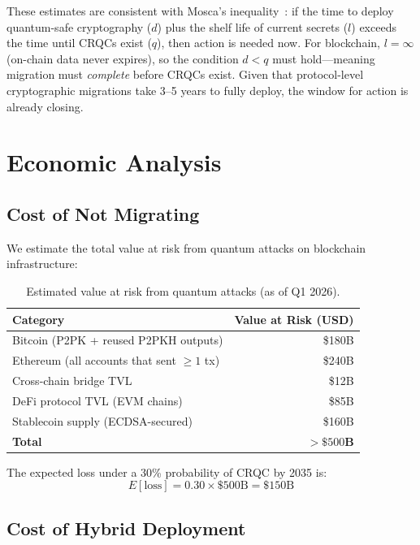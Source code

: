 \documentclass[11pt,a4paper]{article}
\begin{document}
These estimates are consistent with Mosca's inequality~\cite{mosca2018}: if the time
to deploy quantum-safe cryptography ($d$) plus the shelf life of current secrets
($l$) exceeds the time until CRQCs exist ($q$), then action is needed now. For
blockchain, $l = \infty$ (on-chain data never expires), so the condition $d < q$
must hold---meaning migration must \emph{complete} before CRQCs exist. Given that
protocol-level cryptographic migrations take 3--5 years to fully deploy, the window
for action is already closing.

\section{Economic Analysis}
\label{sec:economics}

\subsection{Cost of Not Migrating}

We estimate the total value at risk from quantum attacks on blockchain infrastructure:

\begin{table}[ht]
\centering
\caption{Estimated value at risk from quantum attacks (as of Q1 2026).}
\label{tab:value-at-risk}
\begin{tabular}{lr}
\toprule
\textbf{Category} & \textbf{Value at Risk (USD)} \\
\midrule
Bitcoin (P2PK + reused P2PKH outputs) & \$180B \\
Ethereum (all accounts that sent $\geq 1$ tx) & \$240B \\
Cross-chain bridge TVL & \$12B \\
DeFi protocol TVL (EVM chains) & \$85B \\
Stablecoin supply (ECDSA-secured) & \$160B \\
\midrule
\textbf{Total} & $>\$500$\textbf{B} \\
\bottomrule
\end{tabular}
\end{table}

The expected loss under a 30\% probability of CRQC by 2035 is:
\[
  E[\text{loss}] = 0.30 \times \$500\text{B} = \$150\text{B}
\]

\subsection{Cost of Hybrid Deployment}
\end{document}
